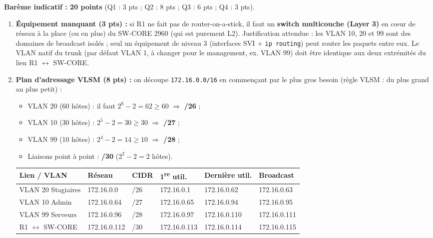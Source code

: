 \documentclass[11pt]{article}
\begin{document}
\begin{corrige}
\textbf{Barème indicatif : 20 points} (Q1 : 3 pts ; Q2 : 8 pts ; Q3 : 6 pts ; Q4 : 3 pts).

\begin{enumerate}
    \item \textbf{Équipement manquant (3 pts) :} si R1 ne fait pas de router-on-a-stick, il faut un \textbf{switch multicouche (Layer 3)} en cœur de réseau à la place (ou en plus) du SW-CORE 2960 (qui est purement L2). Justification attendue : les VLAN 10, 20 et 99 sont des domaines de broadcast isolés ; seul un équipement de niveau 3 (interfaces SVI + \texttt{ip routing}) peut router les paquets entre eux. Le VLAN natif du trunk (par défaut VLAN 1, à changer pour le management, ex. VLAN 99) doit être identique aux deux extrémités du lien R1 $\leftrightarrow$ SW-CORE.
    \item \textbf{Plan d'adressage VLSM (8 pts) :} on découpe \texttt{172.16.0.0/16} en commençant par le plus gros besoin (règle VLSM : du plus grand au plus petit) :
    \begin{itemize}
        \item VLAN 20 (60 hôtes) : il faut $2^6 - 2 = 62 \ge 60$ $\Rightarrow$ \textbf{/26} ;
        \item VLAN 10 (30 hôtes) : $2^5 - 2 = 30 \ge 30$ $\Rightarrow$ \textbf{/27} ;
        \item VLAN 99 (10 hôtes) : $2^4 - 2 = 14 \ge 10$ $\Rightarrow$ \textbf{/28} ;
        \item Liaisons point à point : \textbf{/30} ($2^2 - 2 = 2$ hôtes).
    \end{itemize}
    \begin{center}
    \small
    \begin{tabular}{|l|l|l|l|l|l|}
    \hline
    \rowcolor{popblueL}
    \textbf{Lien / VLAN} & \textbf{Réseau} & \textbf{CIDR} & \textbf{1\textsuperscript{re} util.} & \textbf{Dernière util.} & \textbf{Broadcast} \\ \hline
    VLAN 20 Stagiaires & 172.16.0.0 & /26 & 172.16.0.1 & 172.16.0.62 & 172.16.0.63 \\ \hline
    VLAN 10 Admin & 172.16.0.64 & /27 & 172.16.0.65 & 172.16.0.94 & 172.16.0.95 \\ \hline
    VLAN 99 Serveurs & 172.16.0.96 & /28 & 172.16.0.97 & 172.16.0.110 & 172.16.0.111 \\ \hline
    R1 $\leftrightarrow$ SW-CORE & 172.16.0.112 & /30 & 172.16.0.113 & 172.16.0.114 & 172.16.0.115 \\ \hline

\end{tabular}
\end{center}
\end{enumerate}
\end{corrige}
\end{document}
